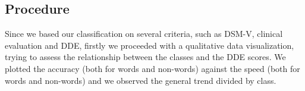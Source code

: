\documentclass[11pt, a4paper, twoside, openright]{article}
\begin{document}
\subsection{Procedure}
Since we based our classification on several criteria, such as DSM-V,
clinical evaluation and DDE, firstly we proceeded with a qualitative
data visualization, trying to assess the relationship between the
classes and the DDE scores. We plotted the accuracy (both for words
and non-words) against the speed (both for words and non-words) and we
observed the general trend divided by class. 
\end{document}
